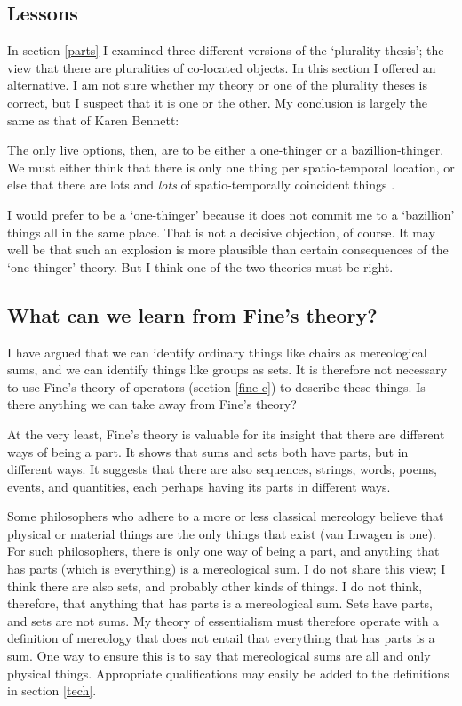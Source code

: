 \documentclass[11pt]{article}
\newenvironment{squote}{%
\begin{spacing}{1}
\begin{list}{}{%
\setlength{\labelwidth}{0pt}%
\rightmargin\leftmargin%
}
\item\relax
}{%
\end{list}%
\end{spacing}
}
\begin{document}
\begin{spacing}{1.5}
\section{Lessons}
\label{lessons-e}
In section \ref{parts} I examined three different versions of the
`plurality thesis'; the view that there are pluralities of co-located
objects.  In this section I offered an alternative.  I am not sure
whether my theory or one of the plurality theses is correct, but I
suspect that it is one or the other.  My conclusion is largely the
same as that of Karen Bennett:

\begin{squote}
The only live options, then, are to be either a one-thinger or a
bazillion-thinger.  We must either think that there is only one thing per
spatio-temporal location, or else that there are lots and \emph{lots} of
spatio-temporally coincident things \citeyearpar[358]{bennett2004}.
\end{squote}

I would prefer to be a `one-thinger' because it does not commit me to
a `bazillion' things all in the same place.  That is not a decisive
objection, of course.  It may well be that such an explosion is more
plausible than certain consequences of the `one-thinger' theory.  But
I think one of the two theories must be right.

\subsection{What can we learn from Fine's theory?}
\label{need-fine}
I have argued that we can identify ordinary things like chairs as
mereological sums, and we can identify things like groups as sets.  It
is therefore not necessary to use Fine's theory of operators (section
\ref{fine-c}) to describe these things.  Is there anything we can take
away from Fine's theory?

At the very least, Fine's theory is valuable for its insight that
there are different ways of being a part.  It shows that sums and sets
both have parts, but in different ways.  It suggests that there are
also sequences, strings, words, poems, events, and quantities, each
perhaps having its parts in different ways.

Some philosophers who adhere to a more or less classical mereology
believe that physical or material things are the only things that
exist (van Inwagen is one).  For such philosophers, there is only one
way of being a part, and anything that has parts (which is everything)
is a mereological sum.  I do not share this view; I think there are
also sets, and probably other kinds of things.  I do not think,
therefore, that anything that has parts is a mereological sum.  Sets
have parts, and sets are not sums.  My theory of essentialism must
therefore operate with a definition of mereology that does not entail
that everything that has parts is a sum.  One way to ensure this is to
say that mereological sums are all and only physical things.
Appropriate qualifications may easily be added to the definitions in
section \ref{tech}.


\end{spacing}
\end{document}
